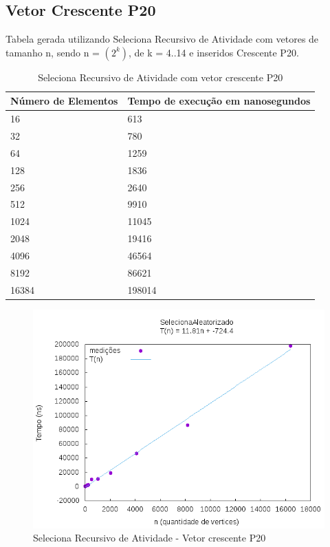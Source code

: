 \documentclass[12pt,a4paper,twoside]{report}
\begin{document}
\subsection{Vetor Crescente P20}
Tabela gerada utilizando Seleciona Recursivo de Atividade com vetores de tamanho n, sendo n = $(2^k)$, de k = 4..14 e inseridos Crescente P20.
\begin{table}[H]
\centering
\caption{Seleciona Recursivo de Atividade com vetor crescente P20}
\label{my-label}
\begin{tabular}{|l|l|}
\hline
\multicolumn{1}{|c|}{\textbf{Número de Elementos}} & \multicolumn{1}{c|}{\textbf{Tempo de execução em nanosegundos}} \\ \hline
16 & 613 \\ \hline
32 & 780 \\ \hline
64 & 1259 \\ \hline
128 & 1836 \\ \hline
256 & 2640 \\ \hline
512 & 9910 \\ \hline
1024 & 11045 \\ \hline
2048 & 19416 \\ \hline
4096 & 46564 \\ \hline
8192 & 86621 \\ \hline
16384 & 198014 \\ \hline

\end{tabular}
\end{table}

\begin{figure}[H]
    \centering
    \includegraphics[width=0.7\linewidth]{graficos/SeletorRecursivoAtividades/Crescente P20/SelecionaAleatorizado.png}
  \caption{Seleciona Recursivo de Atividade - Vetor crescente P20}
\end{figure}
\end{document}
